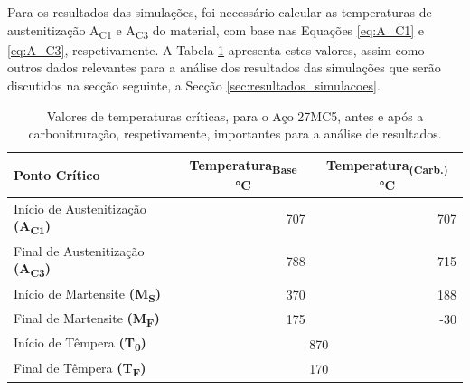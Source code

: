 \par
Para os resultados das simulações, foi necessário calcular as temperaturas de austenitização A\textsubscript{C1} e A\textsubscript{C3} do material, com base nas Equações \ref{eq:A_C1} e \ref{eq:A_C3}, respetivamente. A Tabela \ref{tab:temp_sim} apresenta estes valores, assim como outros dados relevantes para a análise dos resultados das simulações que serão discutidos na secção seguinte, a Secção \ref{sec:resultados_simulacoes}.
\begin{table}[htb]
    \centering
    \caption[Valores de temperatura importantes para a análise de resultados]%
    {Valores de temperaturas críticas, para o Aço 27MC5, antes e após a carbonitruração, respetivamente, importantes para a análise de resultados.}
    \label{tab:temp_sim}
    \begin{tabular}{lrr} 
    \toprule
    \textbf{Ponto Crítico}                  & \multicolumn{1}{c}{\textbf{Temperatura\textsubscript{Base}} °C} & \multicolumn{1}{c}{\textbf{Temperatura\textsubscript{(Carb.)}} °C}  \\ 
    \hline\hline
    Início de Austenitização \textbf{(A\textsubscript{C1})} & 707                                            & 707                                              \\
    Final de Austenitização \textbf{(A\textsubscript{C3})}  & 788                                            & 715                                               \\
    Início de Martensite \textbf{(M\textsubscript{S})}      & 370                                            & 188                                               \\
    Final de Martensite \textbf{(M\textsubscript{F})}       & 175                                            & -30                                               \\
    \hline
    Início de Têmpera \textbf{(T\textsubscript{0})}         & \multicolumn{2}{c}{870}                                                                                \\
    Final de Têmpera \textbf{(T\textsubscript{F})}          & \multicolumn{2}{c}{170}                                                                                \\
    \bottomrule
    \end{tabular}
    \end{table}
\newpage

